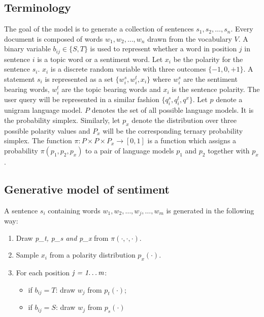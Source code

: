 \subsection{Terminology}

The goal of the model is to generate a collection of sentences \(s_1,s_2,\dots,s_n\). Every document is composed of words \(w_1,w_2,\dots,w_n\) drawn from the vocabulary
\(V\). A binary variable \(b_{ij} \in \{S,T\}\) is used to represent whether a word in position \(j\) in sentence \(i\) is a topic word or a sentiment word. Let \(x_i\)
be the polarity for the sentence \(s_i\). \(x_i\) is a discrete random variable with three outcomes \(\{-1,0,+1\}\). A statement \(s_i\) is represented as a set 
\(\{w_i^s,w_i^t,x_i\}\) where \(w_i^s\) are the sentiment bearing words, \(w_i^t\) are the topic bearing words and \(x_i\) is the sentence polarity. The user query will
be represented in a similar fashion \(\{q_i^s,q_i^t,q^x\}\). Let \(p\) denote a unigram language model. \(P\) denotes the set of all possible language models. It is the
probability simplex. Similarly, let \(p_x\) denote the distribution over three possible polarity values and \(P_x\) will be the corresponding ternary probability simplex.
The function \(\pi:P \times P \times P_x\to[0,1]\) is a function which assigns a probability \(\pi(p_1,p_2,p_x)\) to a pair of language models \(p_1\) and \(p_2\) together
with \(p_x\).

\subsection{Generative model of sentiment}

A sentence \(s_i\) containing words \(w_1,w_2,\dots,w_j,\dots,w_m\) is generated in the following way:

\begin{enumerate}
 \item Draw \textit{p_t, p_s and p_x} from \(\pi (\cdot,\cdot,\cdot)\).
 \item Sample \(x_i\) from a polarity distribution \(p_x(\cdot)\).
 \item For each position \(\textit{j = 1\dots m}\):
  \begin{itemize}
   \item if \(b_{ij}=T\): draw \(w_{j}\) from \(p_t(\cdot)\);
   \item if \(b_{ij}=S\): draw \(w_{j}\) from \(p_s(\cdot)\)
  \end{itemize}
\end{enumerate}

